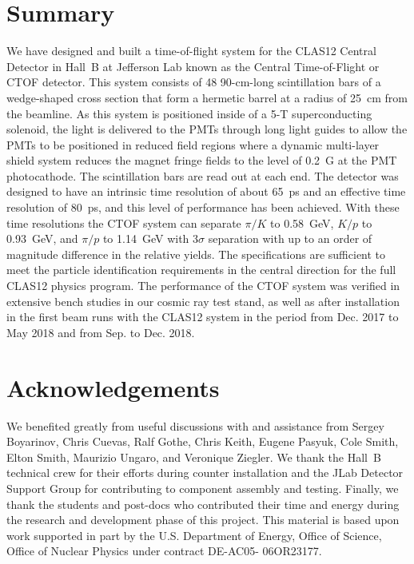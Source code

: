 \documentclass[3p,times,twocolumn]{elsarticle}
\begin{document}
\section{Summary}
\label{sec:summary}

We have designed and built a time-of-flight system for the CLAS12 Central Detector in Hall~B 
at Jefferson Lab known as the Central Time-of-Flight or CTOF detector. This system consists 
of 48 90-cm-long scintillation bars of a wedge-shaped cross section that form a hermetic barrel
at a radius of 25~cm from the beamline. As this system is positioned inside of a 5-T superconducting
solenoid, the light is delivered to the PMTs through long light guides to allow the PMTs to be positioned
in reduced field regions where a dynamic multi-layer shield system reduces the magnet fringe fields to
the level of 0.2~G at the PMT photocathode. The scintillation bars are read out at each end. The
detector was designed to have an intrinsic time resolution of about 65~ps and an effective time resolution
of 80~ps, and this level of performance has been achieved. With these time resolutions the CTOF system
can separate $\pi/K$ to 0.58~GeV, $K/p$ to 0.93~GeV, and $\pi/p$ to 1.14~GeV with 3$\sigma$
separation with up to an order of magnitude difference in the relative yields.  The specifications are
sufficient to meet the particle identification requirements in the central direction for the full CLAS12
physics program. The performance of the CTOF system was verified in extensive bench studies in our
cosmic ray test stand, as well as after installation in the first beam runs with the CLAS12 system in the
period from Dec. 2017 to May 2018 and from Sep. to Dec. 2018. 

\section*{Acknowledgements}

We benefited greatly from useful discussions with and assistance from Sergey Boyarinov, Chris
Cuevas, Ralf Gothe, Chris Keith, Eugene Pasyuk, Cole Smith, Elton Smith, Maurizio Ungaro, and
Veronique Ziegler. We thank the Hall~B technical crew for their efforts during counter installation
and the JLab Detector Support Group for contributing to component assembly and testing. Finally,
we thank the students and post-docs who contributed their time and energy during the research
and development phase of this project. This material is based upon work supported in part by the
U.S. Department of Energy, Office of Science, Office of Nuclear Physics under contract
DE-AC05- 06OR23177.
\end{document}
